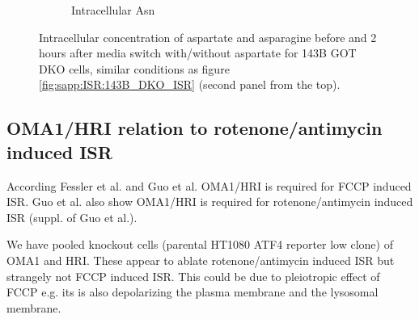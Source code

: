 \begin{figure}[!ht]
\begin{subfigure}[b]{0.35\textwidth}
         \caption{Intracellular Asn}
         \label{fig:sapp:ISR:143B_GOT_DKO_ISR_Asn_conc}
     \end{subfigure}
     \hfill
        \caption[Intracellular Asp/Asn at ISR in GOT DKO]{
        Intracellular concentration of aspartate and asparagine before and 2 hours after media switch with/without aspartate for 143B GOT DKO cells, similar conditions as figure \ref{fig:sapp:ISR:143B_DKO_ISR} (second panel from the top).
        }
        \label{fig:sapp:ISR:143B_GOT_DKO_ISR_conc}
\end{figure}





\FloatBarrier
\subsection{OMA1/HRI relation to rotenone/antimycin induced ISR}
According Fessler et al. and Guo et al. \cite{Fessler2020-zk, Guo2020-ia} OMA1/HRI is required for FCCP induced ISR.
Guo et al. also show OMA1/HRI is required for rotenone/antimycin induced ISR (suppl. of Guo et al.).

We have pooled knockout cells (parental HT1080 ATF4 reporter low clone) of OMA1 and HRI.
These appear to ablate rotenone/antimycin induced ISR but strangely not FCCP induced ISR.
This could be due to pleiotropic effect of FCCP e.g. its is also depolarizing the plasma membrane and the lysosomal membrane.

